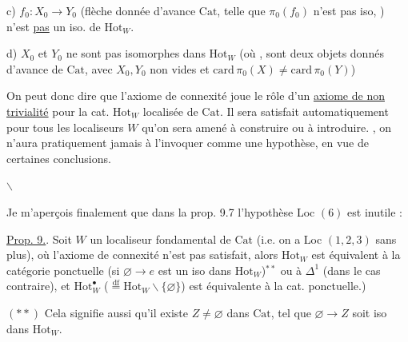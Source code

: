 c)  $f_0:X_0\to Y_0$ (flèche donnée d'avance  $\mathrm{Cat}$, telle que $\pi_0(f_0)$ n'est pas iso, ) n'est \uline{pas} un iso. de $\mathrm{Hot}_W$.

d) $X_0$ et $Y_0$ ne sont pas isomorphes dans $\mathrm{Hot}_W$ (où ,  sont deux objets donnés d'avance de $\mathrm{Cat}$, avec $X_0,Y_0$ non vides et $\mathrm{card}\,\pi_0(X)\ne\mathrm{card}\,\pi_0(Y)$)

\margin{\rule[-3\baselineskip]{0.4pt}{4\baselineskip}\hspace{1.4pt}\rule[-3.15\baselineskip]{0.4pt}{4.15\baselineskip}}

On peut donc dire que l'axiome de connexité joue le rôle d'un \uline{axiome de non trivialité} pour la cat. $\mathrm{Hot}_W$ localisée de $\mathrm{Cat}$. Il sera satisfait automatiquement pour tous les localiseurs  $W$ qu'on sera amené à construire ou à introduire. , on n'aura pratiquement jamais à l'invoquer comme une hypothèse, en vue de certaines conclusions.

$\backslash$

Je m'aperçois finalement que dans la prop. 9.7 l'hypothèse Loc $(6)$ est inutile :



\uline{Prop. 9.}. Soit $W$ un localiseur fondamental de $\mathrm{Cat}$ (i.e. on a Loc $(1,2,3)$ sans plus),  où l'axiome de connexité n'est pas satisfait, alors $\mathrm{Hot}_W$ est équivalent à la catégorie ponctuelle (si $\varnothing\to e$ est un iso dans $\mathrm{Hot}_W$)$^{**}$ ou à $\Delta^1$ (dans le cas contraire), et $\mathrm{Hot}^{\bullet}_W$ ($\overset{\mathrm{df}}{=}\mathrm{Hot}_W\smallsetminus\{\varnothing\}$) est équivalente à la cat. ponctuelle.)


$(**)$ Cela signifie aussi qu'il existe $Z\ne\varnothing$ dans $\mathrm{Cat}$, tel que $\varnothing\to Z$ soit iso dans $\mathrm{Hot}_W$.

